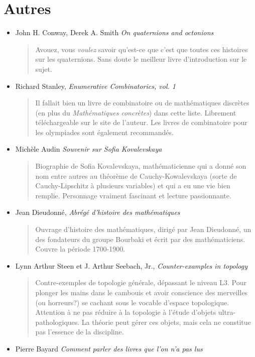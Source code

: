 \documentclass{article}
\begin{document}
\section{Autres}


\begin{itemize}
\item John H. Conway, Derek A. Smith \emph{On quaternions and octonions}
\begin{quote}
Avouez, vous \emph{voulez} savoir qu'est-ce que c'est que toutes ces histoires sur les quaternions. Sans doute le meilleur livre d'introduction sur le sujet.
\end{quote}
\item Richard Stanley, \emph{Enumerative Combinatorics, vol. 1}
\begin{quote}
Il fallait bien un livre de combinatoire ou de mathématiques discrètes (en plus du \emph{Mathématiques concrètes}) dans cette liste. Librement téléchargeable sur le site de l'auteur. Les livres de combinatoire pour les olympiades sont également recommandés.
\end{quote}
\item Michèle Audin \emph{Souvenir sur Sofia Kovalevskaya}
\begin{quote}
Biographie de Sofia Kovalevskaya, mathématicienne qui a donné son nom entre autres au théorème de Cauchy-Kowalevskaya (sorte de Cauchy-Lipschitz à plusieurs variables) et qui a eu une vie bien remplie. Personnage vraiment fascinant et lecture passionnante.
\end{quote}
\item Jean Dieudonné, \emph{Abrégé d'histoire des mathématiques}
\begin{quote}
Ouvrage d'histoire des mathématiques, dirigé par Jean Dieudonné, un des fondateurs du groupe Bourbaki et écrit par des mathématiciens. Couvre la période 1700-1900. 
\end{quote}
\item Lynn Arthur Steen et J. Arthur Seebach, Jr., \emph{Counter-examples in topology}
\begin{quote}
Contre-exemples de topologie générale, dépassant le niveau L3. Pour plonger les mains dans le cambouis et avoir conscience des  merveilles (ou horreurs?) se cachant sous le vocable d'\og espace topologique\fg. Attention à ne pas réduire à la topologie à l'étude d'objets ultra-pathologiques. La théorie peut gérer ces objets, mais cela ne constitue pas l'essence de la discipline.
\end{quote}
\item Pierre Bayard \emph{Comment parler des livres que l'on n'a pas lus}
\end{itemize}
\end{document}
